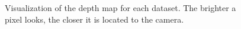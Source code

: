 \documentclass{paper}
\begin{document}
\begin{figure}[h!]
\begin{subfigure}{0.3\textwidth}
    \end{subfigure}
    \caption{Visualization of the depth map for each dataset. The brighter a pixel looks, the closer it is located to the camera.}
    \label{fig:depthmap}       
\end{figure}




 
\end{document}
